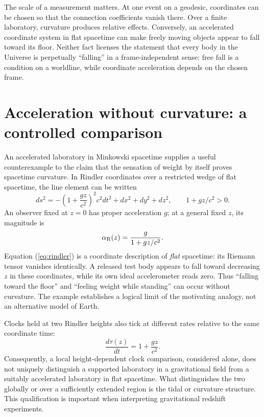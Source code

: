 \documentclass[11pt,letterpaper]{article}
\begin{document}
The scale of a measurement matters. At one event on a geodesic, coordinates can be chosen so that the connection coefficients vanish there. Over a finite laboratory, curvature produces relative effects. Conversely, an accelerated coordinate system in flat spacetime can make freely moving objects appear to fall toward its floor. Neither fact licenses the statement that every body in the Universe is perpetually ``falling'' in a frame-independent sense: free fall is a condition on a worldline, while coordinate acceleration depends on the chosen frame.

\section{Acceleration without curvature: a controlled comparison}

An accelerated laboratory in Minkowski spacetime supplies a useful counterexample to the claim that the sensation of weight by itself proves spacetime curvature. In Rindler coordinates over a restricted wedge of flat spacetime, the line element can be written \cite{Rindler}
\begin{equation}
 ds^2=-\left(1+\frac{gz}{c^2}\right)^2c^2dt^2+dx^2+dy^2+dz^2,
 \qquad 1+gz/c^2>0 .
 \label{eq:rindler}
\end{equation}
An observer fixed at $z=0$ has proper acceleration $g$; at a general fixed $z$, its magnitude is
\begin{equation}
 \alpha_{\rm R}(z)=\frac{g}{1+gz/c^2}.
 \label{eq:rindler-a}
\end{equation}
Equation (\ref{eq:rindler}) is a coordinate description of \emph{flat} spacetime: its Riemann tensor vanishes identically. A released test body appears to fall toward decreasing $z$ in these coordinates, while its own ideal accelerometer reads zero. Thus ``falling toward the floor'' and ``feeling weight while standing'' can occur without curvature. The example establishes a logical limit of the motivating analogy, not an alternative model of Earth.

Clocks held at two Rindler heights also tick at different rates relative to the same coordinate time:
\begin{equation}
 \frac{d\tau(z)}{dt}=1+\frac{gz}{c^2}.
 \label{eq:rindler-clock}
\end{equation}
Consequently, a local height-dependent clock comparison, considered alone, does not uniquely distinguish a supported laboratory in a gravitational field from a suitably accelerated laboratory in flat spacetime. What distinguishes the two globally or over a sufficiently extended region is the tidal or curvature structure. This qualification is important when interpreting gravitational redshift experiments.
\end{document}
